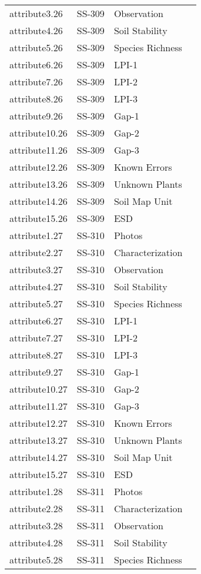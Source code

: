 \documentclass[
]{article}
\begin{document}
\begin{longtable}[]{@{}llll@{}}
attribute3.26 & SS-309 & Observation & \\
attribute4.26 & SS-309 & Soil Stability & \\
attribute5.26 & SS-309 & Species Richness & \\
attribute6.26 & SS-309 & LPI-1 & \\
attribute7.26 & SS-309 & LPI-2 & \\
attribute8.26 & SS-309 & LPI-3 & \\
attribute9.26 & SS-309 & Gap-1 & \\
attribute10.26 & SS-309 & Gap-2 & \\
attribute11.26 & SS-309 & Gap-3 & \\
attribute12.26 & SS-309 & Known Errors & \\
attribute13.26 & SS-309 & Unknown Plants & \\
attribute14.26 & SS-309 & Soil Map Unit & \\
attribute15.26 & SS-309 & ESD & \\
attribute1.27 & SS-310 & Photos & \\
attribute2.27 & SS-310 & Characterization & \\
attribute3.27 & SS-310 & Observation & \\
attribute4.27 & SS-310 & Soil Stability & \\
attribute5.27 & SS-310 & Species Richness & \\
attribute6.27 & SS-310 & LPI-1 & \\
attribute7.27 & SS-310 & LPI-2 & \\
attribute8.27 & SS-310 & LPI-3 & \\
attribute9.27 & SS-310 & Gap-1 & \\
attribute10.27 & SS-310 & Gap-2 & \\
attribute11.27 & SS-310 & Gap-3 & \\
attribute12.27 & SS-310 & Known Errors & \\
attribute13.27 & SS-310 & Unknown Plants & \\
attribute14.27 & SS-310 & Soil Map Unit & \\
attribute15.27 & SS-310 & ESD & \\
attribute1.28 & SS-311 & Photos & \\
attribute2.28 & SS-311 & Characterization & \\
attribute3.28 & SS-311 & Observation & \\
attribute4.28 & SS-311 & Soil Stability & \\
attribute5.28 & SS-311 & Species Richness & \\

\end{longtable}
\end{document}
